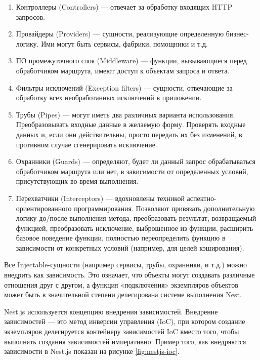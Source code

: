 \begin{enumerate} 
  \item Контроллеры (Controllers) — отвечает за обработку входящих HTTP запросов.
  
  \item Провайдеры (Providers) — сущности, реализующие определенную бизнес-логику. Ими могут быть сервисы, фабрики, помощники и т.д.

  \item ПО промежуточного слоя (Middleware) — функции, вызывающиеся перед обработчиком маршрута, имеют доступ к объектам запроса и ответа.

  \item Фильтры исключений (Exception filters) — сущности, отвечающие за обработку всех необработанных исключений в приложении.

  \item Трубы (Pipes) — могут иметь два различных варианта использования. Преобразовывать входные данные в желаемую форму. Проверять входные данных и, если они действительны, просто передать их без изменений, в противном случае сгенерировать исключение.

  \item Охранники (Guards) — определяют, будет ли данный запрос обрабатываться обработчиком маршрута или нет, в зависимости от определенных условий, присутствующих во время выполнения.

  \item Перехватчики (Interceptors) — вдохновлены техникой аспектно-ориентированного программирования. Позволяют привязать дополнительную логику до/после выполнения метода, преобразовать результат, возвращаемый функцией, преобразовать исключение, выброшенное из функции, расширить базовое поведение функции, полностью переопределить функцию в зависимости от конкретных условий (например, для целей кэширования).
\end{enumerate}

Все Injectable-сущности (например сервисы, трубы, охранники, и т.д.) можно внедрить как зависимость. Это означает, что объекты могут создавать различные отношения друг с другом, а функция «подключения» экземпляров объектов может быть в значительной степени делегирована системе выполнения Nest.

Nest.js используется концепцию внедрения зависимостей. Внедрение зависимостей — это метод инверсии управления (IoC), при котором создание экземпляров делегируется контейнеру зависимостей IoC вместо того, чтобы выполнять создания зависимостей императивно. Пример того, как внедряются зависимости в Nest.js показан на рисунке \ref{fig:nestjs-ioc}.

